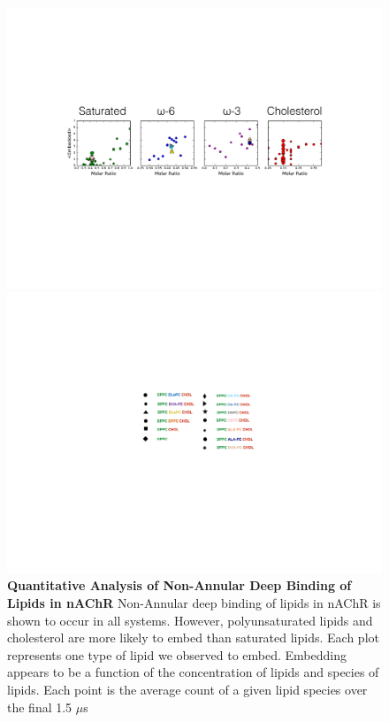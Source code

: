 \documentclass[10pt, letterpaper]{article}
\begin{document}
\begin{figure}[H]
   \centerline{\includegraphics[width=\textwidth,scale=0.5]{Embeded_plot.pdf}}
   \centerline{\includegraphics[scale=0.45]{Legend.pdf}}
   \caption[Quantitative Analysis of Non-Annular Deep Binding of Lipids in nAChR]{\textbf{Quantitative Analysis of Non-Annular Deep Binding of Lipids in nAChR} Non-Annular deep binding of lipids in nAChR is shown to occur in all systems. However, polyunsaturated lipids and cholesterol are more likely to embed than saturated lipids. Each plot represents one type of lipid we observed to embed. Embedding appears to be a function of the concentration of lipids and species of lipids. Each point is the average count of a given lipid species over the final 1.5 $\mu$s}\label{fig:emb}

 \end{figure}
\newpage
\end{document}
